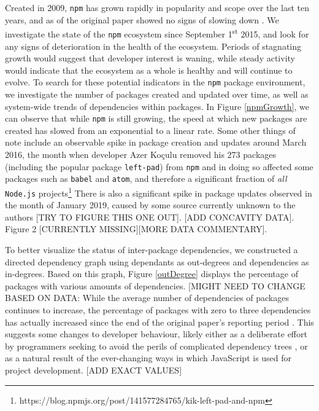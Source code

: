 \documentclass[10pt,conference]{IEEEtran}
\def\code#1{\texttt{#1}}
\begin{document}
  Created in 2009, \code{npm} has grown
  rapidly in popularity and scope over the last ten years, and 
  as of the original paper showed no signs of slowing down \cite{Wittern:2016}.
  We investigate the state of the \code{npm} ecosystem
  since September 1\textsuperscript{st} 2015, and look for any signs of deterioration in 
  the health of the ecosystem. Periods of stagnating growth would suggest
  that developer interest is waning, while steady activity would 
  indicate that the ecosystem as a whole is healthy and will continue to
  evolve. To search for these potential indicators in the \code{npm} package environment,
  we investigate the number of packages created and updated over time, as well
  as system-wide trends of dependencies within packages. In Figure \ref{npmGrowth},
  we can observe that while \code{npm} is still growing, the speed at which new packages
  are created has slowed from an exponential to a linear rate. Some other things of note 
  include an observable spike in package creation and updates around March 2016, the month 
  when developer Azer Koçulu removed his 273 packages (including the popular package 
  \code{left-pad}) from \code{npm} and in doing so affected some packages such as 
  \code{babel} and \code{atom}, and therefore a significant fraction of \emph{all} 
  \code{Node.js} projects\footnote{https://blog.npmjs.org/post/141577284765/kik-left-pad-and-npm}
  There is also a significant spike in package updates observed in the month of January 2019, caused 
  by some source currently unknown to the authors [TRY TO FIGURE THIS ONE OUT].
  [ADD CONCAVITY DATA]. Figure 2 [CURRENTLY MISSING][MORE DATA COMMENTARY].



  To better visualize the status of inter-package dependencies, we constructed
  a directed dependency graph using dependants as out-degrees and
  dependencies as in-degrees. Based on this graph, Figure \ref{outDegree}
  displays the percentage of packages with various amounts of dependencies. 
  [MIGHT NEED TO CHANGE BASED ON DATA: While the average number of dependencies 
  of packages continues to increase, the percentage of packages with zero 
  to three dependencies has actually increased since the end of the original paper's
  reporting period \cite{Wittern:2016}. This suggests some changes to developer 
  behaviour, likely either as a deliberate effort by programmers seeking to avoid the perils of 
  complicated dependency trees \cite{Kikas:2017}, or as a natural result of the ever-changing
  ways in which JavaScript is used for project development. [ADD EXACT VALUES]
\end{document}
